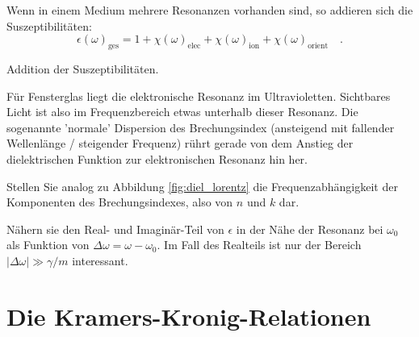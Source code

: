 Wenn in einem Medium mehrere Resonanzen vorhanden sind, so addieren sich die Suszeptibilitäten:
\begin{equation}
\epsilon(\omega)_\text{ges} = 1 + \chi(\omega)_\text{elec} +  \chi(\omega)_\text{ion}  + \chi(\omega)_\text{orient} \quad .
\end{equation}

\begin{marginfigure}

\caption{Addition der Suszeptibilitäten. \label{fig:diel_multiple_lorentz}}
\end{marginfigure}

Für Fensterglas liegt die elektronische Resonanz im Ultravioletten. Sichtbares Licht ist also im Frequenzbereich etwas unterhalb dieser Resonanz. Die sogenannte 'normale' Dispersion des Brechungsindex (ansteigend mit fallender Wellenlänge / steigender Frequenz) rührt gerade von dem Anstieg der dielektrischen Funktion zur elektronischen Resonanz hin her.


\begin{questions} 
\item Stellen Sie analog zu Abbildung \ref{fig:diel_lorentz} die Frequenzabhängigkeit der Komponenten des Brechungsindexes, also  von $n$ und $k$ dar.

\item Nähern sie den Real- und Imaginär-Teil von $\epsilon$ in der Nähe der Resonanz bei  $\omega_0$ als Funktion von $\Delta \omega = \omega - \omega_0$. Im Fall des Realteils ist nur der Bereich $| \Delta \omega | \gg \gamma/m$ interessant.
\end{questions}

\section{Die Kramers-Kronig-Relationen}

